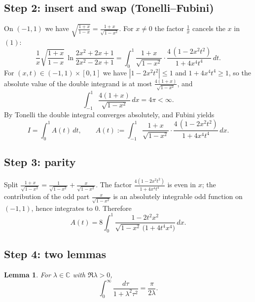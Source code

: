 \documentclass[11pt]{article}
\newtheorem{lemma}{Lemma}
\theoremstyle{remark}
\begin{document}
\subsection*{Step 2: insert and swap (Tonelli--Fubini)}

On $(-1,1)$ we have $\sqrt{\frac{1+x}{1-x}}=\frac{1+x}{\sqrt{1-x^2}}$. For $x\neq0$ the factor $\frac1x$ cancels the $x$ in $(1)$:
$$\frac1x\sqrt{\frac{1+x}{1-x}}\,\ln\frac{2x^2+2x+1}{2x^2-2x+1}
=\int_0^1 \frac{1+x}{\sqrt{1-x^2}}\cdot\frac{4\,(1-2x^2t^2)}{1+4x^4t^4}\,dt .$$
For $(x,t)\in(-1,1)\times[0,1]$ we have $|1-2x^2t^2|\le1$ and $1+4x^4t^4\ge1$, so the absolute value of the double integrand is at most $\frac{4(1+x)}{\sqrt{1-x^2}}$, and
$$\int_{-1}^{1}\frac{4(1+x)}{\sqrt{1-x^2}}\,dx=4\pi<\infty .$$
By Tonelli the double integral converges absolutely, and Fubini yields
\begin{equation}I=\int_0^1 A(t)\,dt,\qquad
A(t):=\int_{-1}^1 \frac{1+x}{\sqrt{1-x^2}}\cdot\frac{4\,(1-2x^2t^2)}{1+4x^4t^4}\,dx. \tag{2}\end{equation}

\subsection*{Step 3: parity}

Split $\frac{1+x}{\sqrt{1-x^2}}=\frac{1}{\sqrt{1-x^2}}+\frac{x}{\sqrt{1-x^2}}$. The factor $\frac{4(1-2x^2t^2)}{1+4x^4t^4}$ is even in $x$; the contribution of the odd part $\frac{x}{\sqrt{1-x^2}}$ is an absolutely integrable odd function on $(-1,1)$, hence integrates to $0$. Therefore
\begin{equation}A(t)=8\int_0^1 \frac{1-2t^2x^2}{\sqrt{1-x^2}\,\big(1+4t^4x^4\big)}\,dx. \tag{3}\end{equation}

\subsection*{Step 4: two lemmas}

\begin{lemma}
\textit{For $\lambda\in\mathbb C$ with $\Re\lambda>0$,}
$$\int_0^\infty\frac{d\tau}{1+\lambda^2\tau^2}=\frac{\pi}{2\lambda}.$$
\end{lemma}
\end{document}
